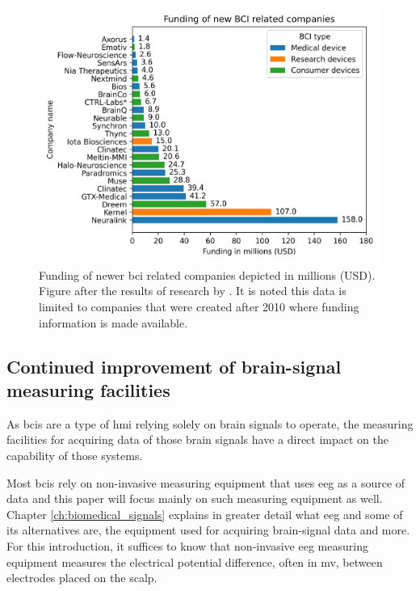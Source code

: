 \begin{figure}[ht]
    \centering
    \includegraphics[width=\linewidth]{../images/introduction/funding.pdf}
    \captionsetup{width=0.9\linewidth}
    \captionsetup{justification=centering}
    \caption{Funding of newer \gls{bci} related companies depicted in millions (USD).\\Figure after the results of research by \citet{bci_money}. It is noted this data is limited to companies that were created after 2010 where funding information is made available.}
    \label{fig:bci_money}
\end{figure}



\subsection{Continued improvement of brain-signal measuring facilities}
\label{subsec:bci_gaining_popularity_better_measuring}


As \glspl{bci} are a type of \gls{hmi} relying solely on brain signals to operate, the measuring facilities for acquiring data of those brain signals have a direct impact on the capability of those systems.

Most \glspl{bci} rely on non-invasive measuring equipment that uses \gls{eeg} as a source of data and this paper will focus mainly on such measuring equipment as well.
Chapter \ref{ch:biomedical_signals} explains in greater detail what \gls{eeg} and some of its alternatives are, the equipment used for acquiring brain-signal data and more.
For this introduction, it suffices to know that non-invasive \gls{eeg} measuring equipment measures the electrical potential difference, often in \gls{mv}, between electrodes placed on the scalp.

